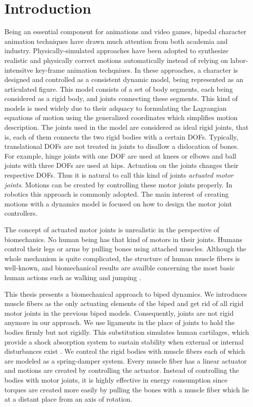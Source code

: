 \documentclass[master,english,final]{kaist-ucs}
\begin{document}
\chapter{Introduction}
Being an essential component for animations and video games,
bipedal character animation techniques have drawn much attention from
both academia and industry. Physically-simulated approaches have been
adopted to synthesize realistic and physically correct motions
automatically instead of relying on labor-intensitve key-frame animation
techqniues. In these approaches, a character is designed and controlled
as a consistent dynamic model, being represented as an articulated
figure. This model consists of a set of body segments, each being
considered as a rigid body, and joints connecting these segments.
This kind of models is used widely due to their adquacy to formulating
the Lagrangian equations of motion using the generalized coordinates
which simplifies motion description.
The joints used in the model are considered as ideal rigid joints,
that is, each of them connects the two rigid bodies with a certain DOFs.
Typically, translational DOFs are not treated in joints to disallow a dislocation of bones.
For example, hinge joints with one DOF are used at knees or elbows and
ball joints with three DOFs are used at hips. Actuation on the joints
changes their respective DOFs. Thus it is natural to call this kind of joints
\emph{actuated motor joints}. Motions can be created by
controlling these motor joints properly. In robotics this approach is
commonly adopted. The main interest of creating motions
with a dynamics model is focused on how to design the motor joint controllers.

The concept of actuated motor joints is unrealistic in the perspective of
biomechanics. No human being has that kind of motors in their joints.
Humans control their legs or arms by pulling bones using attached
muscles. Although the whole mechanism is quite complicated,
the structure of human muscle fibers is well-known, and biomechanical
results are availble concerning the most basic human actions
such as walking and jumping \cite{citeulike:2547705, citeulike:7093575}.

This thesis presents a biomechanical approach to biped dynamics. We
introduces muscle fibers as the only actuating elements
of the biped and get rid of all rigid motor joints in the previous biped
models. Consequently, joints are not rigid anymore in our approach.
We use ligaments in the place of joints
to hold the bodies firmly but not rigidly. This substitution
simulates human cartilages, which provide a shock absorption
system to sustain stability when external or internal disturbances exist \cite{shock}.
We control the rigid bodies with muscle fibers each of which are modeled as
a spring-damper system. Every muscle fiber has a linear actuator and
motions are created by controlling the actuator. Instead of controlling
the bodies with motor joints, it is highly effective in energy consumption
since torques are created more easily by pulling the bones with a muscle
fiber which lie at a distant place from an axis of rotation.
\end{document}
